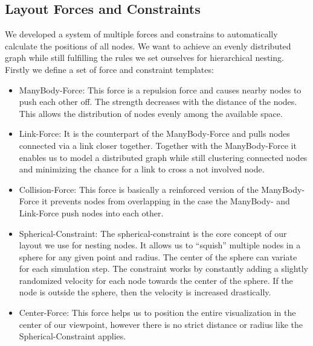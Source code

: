 \subsection{Layout Forces and Constraints}
\label{chap:ps-forces}
We developed a system of multiple forces and constrains to automatically calculate the positions of all nodes. We want to achieve an evenly distributed graph while still fulfilling the rules we set ourselves for hierarchical nesting. Firstly we define a set of force and constraint templates:
\begin{itemize}
    \item ManyBody-Force: This force is a repulsion force and causes nearby nodes to push each other off. The strength decreases with the distance of the nodes. This allows the distribution of nodes evenly among the available space.
    \item Link-Force: It is the counterpart of the ManyBody-Force and pulls nodes connected via a link closer together. Together with the ManyBody-Force it enables us to model a distributed graph while still clustering connected nodes and minimizing the chance for a link to cross a not involved node.
    \item Collision-Force: This force is basically a reinforced version of the ManyBody-Force it prevents nodes from overlapping in the case the ManyBody- and Link-Force push nodes into each other.
    \item Spherical-Constraint: The spherical-constraint is the core concept of our layout we use for nesting nodes. It allows us to “squish” multiple nodes in a sphere for any given point and radius. The center of the sphere can variate for each simulation step. The constraint works by constantly adding a slightly randomized velocity for each node towards the center of the sphere. If the node is outside the sphere, then the velocity is increased drastically.
    \item Center-Force: This force helps us to position the entire visualization in the center of our viewpoint, however there is no strict distance or radius like the Spherical-Constraint applies.
\end{itemize}

